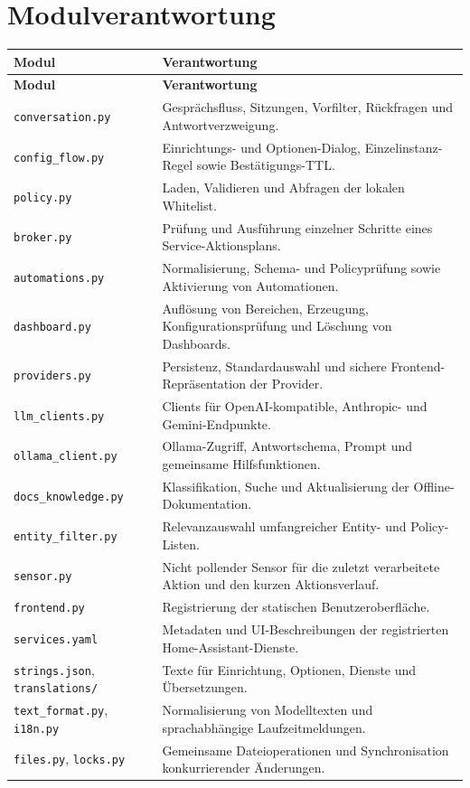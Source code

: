 \documentclass[
  11pt,
  a4paper,
  oneside,
  parskip=half
]{scrreprt}
\newcommand{\code}[1]{\texttt{#1}}
\begin{document}
\section{Modulverantwortung}

\begin{longtable}{@{}L{48mm}L{95mm}@{}}
  \toprule
  \textbf{Modul} & \textbf{Verantwortung} \\
  \midrule
  \endfirsthead
  \toprule
  \textbf{Modul} & \textbf{Verantwortung} \\
  \midrule
  \endhead
  \code{conversation.py} &
    Gesprächsfluss, Sitzungen, Vorfilter, Rückfragen und Antwortverzweigung. \\
  \code{config\_flow.py} &
    Einrichtungs- und Optionen-Dialog, Einzelinstanz-Regel sowie Bestätigungs-TTL. \\
  \code{policy.py} &
    Laden, Validieren und Abfragen der lokalen Whitelist. \\
  \code{broker.py} &
    Prüfung und Ausführung einzelner Schritte eines Service-Aktionsplans. \\
  \code{automations.py} &
    Normalisierung, Schema- und Policyprüfung sowie Aktivierung von Automationen. \\
  \code{dashboard.py} &
    Auflösung von Bereichen, Erzeugung, Konfigurationsprüfung und Löschung von
    Dashboards. \\
  \code{providers.py} &
    Persistenz, Standardauswahl und sichere Frontend-Repräsentation der Provider. \\
  \code{llm\_clients.py} &
    Clients für OpenAI-kompatible, Anthropic- und Gemini-Endpunkte. \\
  \code{ollama\_client.py} &
    Ollama-Zugriff, Antwortschema, Prompt und gemeinsame Hilfsfunktionen. \\
  \code{docs\_knowledge.py} &
    Klassifikation, Suche und Aktualisierung der Offline-Dokumentation. \\
  \code{entity\_filter.py} &
    Relevanzauswahl umfangreicher Entity- und Policy-Listen. \\
  \code{sensor.py} &
    Nicht pollender Sensor für die zuletzt verarbeitete Aktion und den kurzen
    Aktionsverlauf. \\
  \code{frontend.py} &
    Registrierung der statischen Benutzeroberfläche. \\
  \code{services.yaml} &
    Metadaten und UI-Beschreibungen der registrierten Home-Assistant-Dienste. \\
  \code{strings.json}, \code{translations/} &
    Texte für Einrichtung, Optionen, Dienste und Übersetzungen. \\
  \code{text\_format.py}, \code{i18n.py} &
    Normalisierung von Modelltexten und sprachabhängige Laufzeitmeldungen. \\
  \code{files.py}, \code{locks.py} &
    Gemeinsame Dateioperationen und Synchronisation konkurrierender Änderungen. \\
  \bottomrule
\end{longtable}
\end{document}
